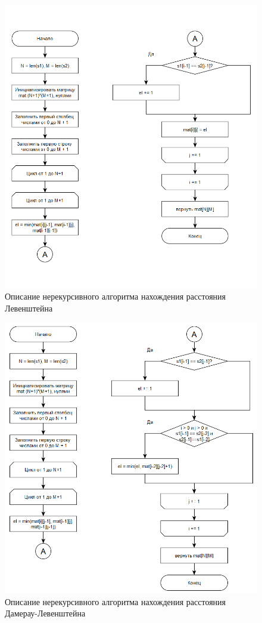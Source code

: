 \documentclass{article}
\begin{document}
\begin{figure}[h]
	\centering
	\includegraphics[scale=0.9]{tools/alg_3.png}
	\caption{Описание нерекурсивного алгоритма нахождения расстояния Левенштейна}
	\label{fig:lev}
\end{figure}

\begin{figure}[h]
	\centering
	\includegraphics[scale=0.9]{tools/alg_4.png}
	\caption{Описание нерекурсивного алгоритма нахождения расстояния Дамерау-Левенштейна}
	\label{fig:dlev}
\end{figure}
\end{document}
